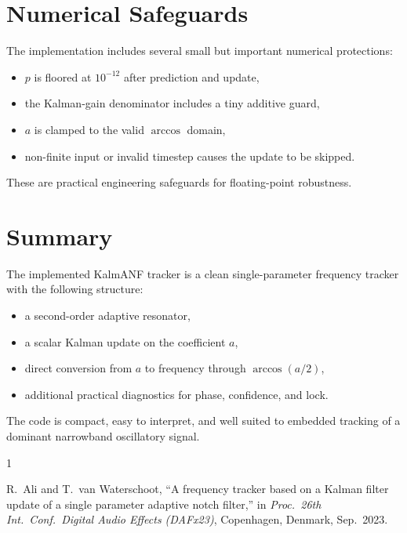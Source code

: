 \documentclass[conference]{IEEEtran}
\begin{document}
    \section{Numerical Safeguards}\label{sec:numerical}

    The implementation includes several small but important numerical protections:
    \begin{itemize}[leftmargin=1.4em]
        \item $p$ is floored at $10^{-12}$ after prediction and update,
        \item the Kalman-gain denominator includes a tiny additive guard,
        \item $a$ is clamped to the valid $\arccos$ domain,
        \item non-finite input or invalid timestep causes the update to be skipped.
    \end{itemize}

    These are practical engineering safeguards for floating-point robustness.

    \section{Summary}

    The implemented KalmANF tracker is a clean single-parameter frequency tracker
    with the following structure:
    \begin{itemize}[leftmargin=1.4em]
        \item a second-order adaptive resonator,
        \item a scalar Kalman update on the coefficient $a$,
        \item direct conversion from $a$ to frequency through $\arccos(a/2)$,
        \item additional practical diagnostics for phase, confidence, and lock.
    \end{itemize}

    The code is compact, easy to interpret, and well suited to embedded tracking
    of a dominant narrowband oscillatory signal.

    \begin{thebibliography}{1}

        R.~Ali and T.~van Waterschoot,
        ``A frequency tracker based on a Kalman filter update of a single parameter
        adaptive notch filter,''
        in \emph{Proc.\ 26th Int.\ Conf.\ Digital Audio Effects (DAFx23)},
        Copenhagen, Denmark, Sep.\ 2023.

    \end{thebibliography}
\end{document}
